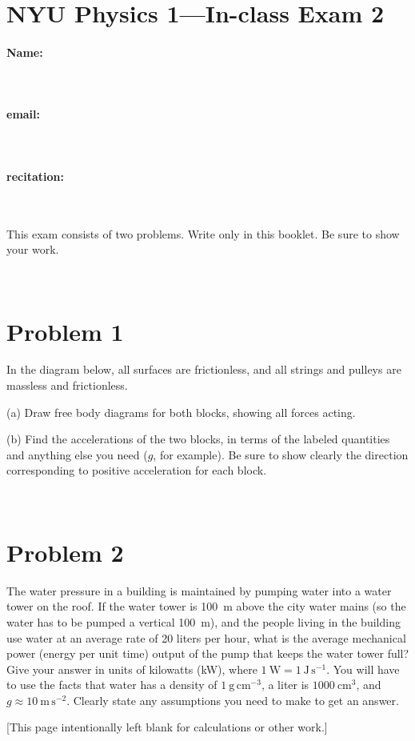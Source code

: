 \documentclass[12pt]{article}
\begin{document}
\section*{NYU Physics 1---In-class Exam 2}

\vfill

\paragraph{Name:} ~

\paragraph{email:} ~

\paragraph{recitation:} ~

\vfill

This exam consists of two problems.  Write only in this booklet.  Be
sure to show your work.

\vfill ~

\clearpage

\section*{Problem 1}

In the diagram below, all surfaces are frictionless, and all strings
and pulleys are massless and frictionless.
\\

(a) Draw free body diagrams for both blocks, showing all forces
acting.

\vfill

(b) Find the accelerations of the two blocks, in terms of the labeled
quantities and anything else you need ($g$, for example).  Be sure to
show clearly the direction corresponding to positive acceleration for
each block.

\vfill ~

\clearpage

\section*{Problem 2}

The water pressure in a building is maintained by pumping water into a
water tower on the roof.  If the water tower is 100~m above the city
water mains (so the water has to be pumped a vertical 100~m), and the
people living in the building use water at an average rate of 20
liters per hour, what is the average mechanical power (energy per unit
time) output of the pump that keeps the water tower full?  Give your
answer in units of kilowatts (kW), where
$1~\mathrm{W}=1~\mathrm{J\,s^{-1}}$.  You will have to use the facts
that water has a density of $1~\mathrm{g\,cm^{-3}}$, a liter is
$1000~\mathrm{cm^3}$, and $g\approx 10~\mathrm{m\,s^{-2}}$.  Clearly
state any assumptions you need to make to get an answer.

\clearpage

[This page intentionally left blank for calculations or other work.]
\end{document}
